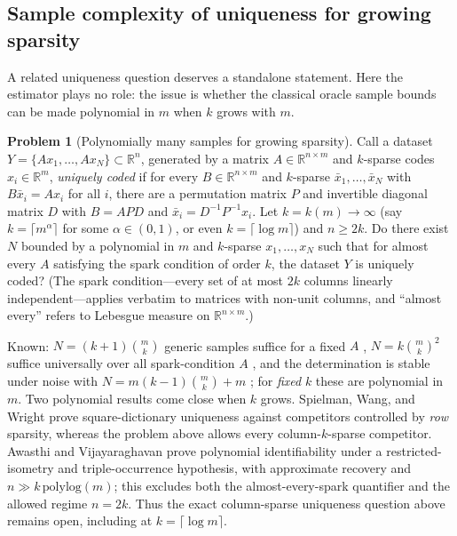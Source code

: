 \documentclass[11pt]{amsart}
\theoremstyle{plain}
\theoremstyle{definition}
\newtheorem{problem}[theorem]{Problem}
\newcommand{\R}{\mathbb{R}}
\begin{document}
\subsection{Sample complexity of uniqueness for growing sparsity}

A related uniqueness question deserves a standalone statement. Here the estimator plays no role: the issue is whether the classical oracle sample bounds can be made polynomial in $m$ when $k$ grows with $m$.

\begin{problem}[Polynomially many samples for growing sparsity]\label{prob:samples}
Call a dataset $Y=\{A x_1,\dots,A x_N\}\subset\R^n$, generated by a matrix $A\in\R^{n\times m}$ and $k$-sparse codes $x_i\in\R^m$, \emph{uniquely coded} if for every $B\in\R^{n\times m}$ and $k$-sparse $\bar x_1,\dots,\bar x_N$ with $B\bar x_i=Ax_i$ for all $i$, there are a permutation matrix $P$ and invertible diagonal matrix $D$ with $B=APD$ and $\bar x_i=D^{-1}P^{-1}x_i$. Let $k=k(m)\to\infty$ (say $k=\lceil m^{\alpha}\rceil$ for some $\alpha\in(0,1)$, or even $k=\lceil\log m\rceil$) and $n\ge 2k$. Do there exist $N$ bounded by a polynomial in $m$ and $k$-sparse $x_1,\dots,x_N$ such that for almost every $A$ satisfying the spark condition of order $k$, the dataset $Y$ is uniquely coded? (The spark condition---every set of at most $2k$ columns linearly independent---applies verbatim to matrices with non-unit columns, and ``almost every'' refers to Lebesgue measure on $\R^{n\times m}$.)
\end{problem}

Known: $N=(k+1)\binom{m}{k}$ generic samples suffice for a fixed $A$ \cite{aharon2006,hillar2015}, $N=k\binom{m}{k}^2$ suffice universally over all spark-condition $A$ \cite{hillar2015}, and the determination is stable under noise with $N = m(k-1)\binom{m}{k}+m$ \cite{garfinkle2019}; for \emph{fixed} $k$ these are polynomial in $m$. Two polynomial results come close when $k$ grows. Spielman, Wang, and Wright \cite{spielman2012} prove square-dictionary uniqueness against competitors controlled by \emph{row} sparsity, whereas the problem above allows every column-$k$-sparse competitor. Awasthi and Vijayaraghavan \cite{awasthi2018} prove polynomial identifiability under a restricted-isometry and triple-occurrence hypothesis, with approximate recovery and $n\gg k\,\mathrm{polylog}(m)$; this excludes both the almost-every-spark quantifier and the allowed regime $n=2k$. Thus the exact column-sparse uniqueness question above remains open, including at $k=\lceil\log m\rceil$.
\end{document}
